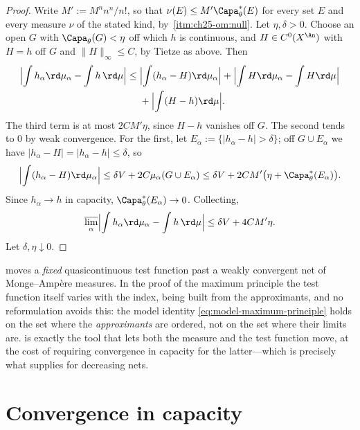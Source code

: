 \begin{proof}
Write \(M':=M^nn^n/n!\), so that
\(\nu(E)\leq M'\Capa^*_\theta(E)\) for every set \(E\) and every measure
\(\nu\) of the stated kind, by
\,\cref{itm:ch25-om:null}.  Let
\(\eta,\delta>0\).  Choose an open \(G\) with \(\Capa_\theta(G)<\eta\) off
which \(h\) is continuous, and \(H\in C^0(X^{\An})\) with \(H=h\) off \(G\)
and \(\|H\|_\infty\leq C\), by Tietze as above.  Then
\[
\begin{split}
 \Bigl|\int h_\alpha\rd\mu_\alpha-\int h\,\rd\mu\Bigr|
 \leq{}&\Bigl|\int(h_\alpha-H)\rd\mu_\alpha\Bigr|
       +\Bigl|\int H\rd\mu_\alpha-\int H\rd\mu\Bigr|\\
      &+\Bigl|\int(H-h)\rd\mu\Bigr| .
\end{split}
\]
The third term is at most \(2CM'\eta\), since \(H-h\) vanishes off \(G\).
The second tends to \(0\) by weak convergence.  For the first, let
\(E_\alpha:=\{|h_\alpha-h|>\delta\}\); off \(G\cup E_\alpha\) we have
\(|h_\alpha-H|=|h_\alpha-h|\leq\delta\), so
\[
 \Bigl|\int(h_\alpha-H)\rd\mu_\alpha\Bigr|
 \leq\delta V+2C\mu_\alpha(G\cup E_\alpha)
 \leq\delta V+2CM'\bigl(\eta+\Capa^*_\theta(E_\alpha)\bigr).
\]
Since \(h_\alpha\to h\) in capacity, \(\Capa^*_\theta(E_\alpha)\to0\).
Collecting,
\[
 \varlimsup_\alpha\Bigl|\int h_\alpha\rd\mu_\alpha-\int h\,\rd\mu\Bigr|
 \leq\delta V+4CM'\eta .
\]
Let \(\delta,\eta\downarrow0\).
\end{proof}

\begin{remark}
\label{rem:ch25-why-joint}
 moves a \emph{fixed} quasicontinuous test
function past a weakly convergent net of Monge--Amp\`ere measures.  In the
proof of the maximum principle the test function itself varies with the
index, being built from the approximants, and no reformulation avoids this:
the model identity \eqref{eq:model-maximum-principle} holds on the set where
the \emph{approximants} are ordered, not on the set where their limits are.
 is exactly the tool that lets both the measure
and the test function move, at the cost of requiring convergence in capacity
for the latter---which is precisely what
 supplies for decreasing nets.
\end{remark}

\section{Convergence in capacity}
\label{sec:ch25-convergence}

